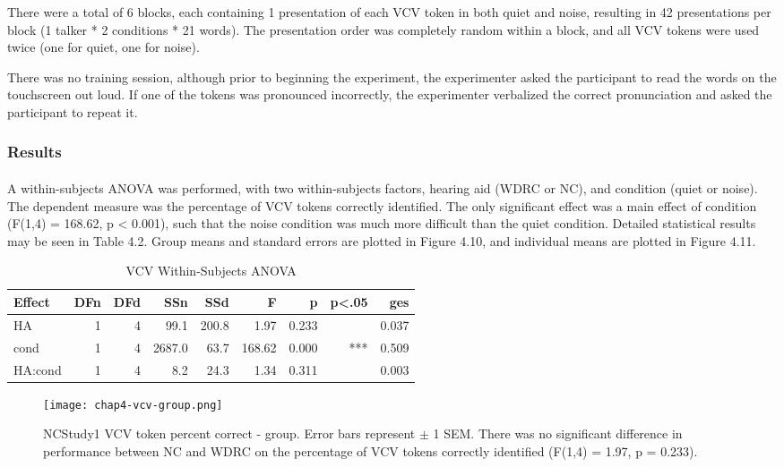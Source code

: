 There were a total of 6 blocks, each containing 1 presentation of each VCV token in both quiet and noise, resulting in 42 presentations per block (1 talker * 2 conditions * 21 words).  The presentation order was completely random within a block, and all VCV tokens were used twice (one for quiet, one for noise).

There was no training session, although prior to beginning the experiment, the experimenter asked the participant to read the words on the touchscreen out loud.  If one of the tokens was pronounced incorrectly, the experimenter verbalized the correct pronunciation and asked the participant to repeat it.
\subsubsection{Results}
\paragraph{}A within-subjects ANOVA was performed, with two within-subjects factors, hearing aid (WDRC or NC), and condition (quiet or noise).  The dependent measure was the percentage of VCV tokens correctly identified.  The only significant effect was a main effect of condition (F(1,4) = 168.62, p < 0.001), such that the noise condition was much more difficult than the quiet condition.  Detailed statistical results may be seen in Table 4.2.  Group means and standard errors are plotted in Figure 4.10, and individual means are plotted in Figure 4.11.

\begin{table}[htp]
\begin{center}
\begin{tabular}{lrrrrrrrr}
       Effect & DFn & DFd  &  SSn &  SSd  &    F  &     p & p<.05  &   ges \\
       \hline
          HA &  1 &  4 &   99.1 & 200.8 &   1.97 & 0.233 &      & 0.037 \\
        cond &  1 &  4 & 2687.0 &  63.7 & 168.62 & 0.000 &    *** & 0.509 \\
     HA:cond &  1 &  4 &    8.2 &  24.3 &   1.34 & 0.311 &      & 0.003 \\
     \hline
\end{tabular}
\end{center}
\caption{VCV Within-Subjects ANOVA}
\end{table}

\begin{figure}[htp]
\begin{center}
\texttt{[image: chap4-vcv-group.png]} \\
\caption[NCStudy1 VCV token percent correct - group]{NCStudy1 VCV token percent correct - group.  Error bars represent $\pm$ 1 SEM.  There was no significant difference in performance between NC and WDRC on the percentage of VCV tokens correctly identified (F(1,4) = 1.97, p = 0.233).}
\label{ch4-vcv-group}
\end{center}
\end{figure}

